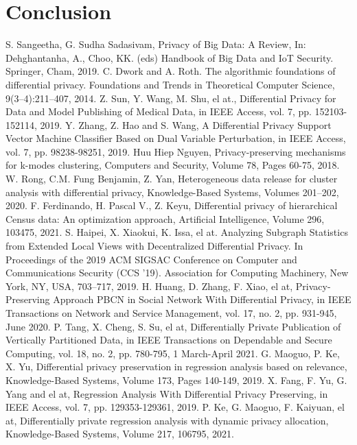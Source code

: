 \documentclass[conference]{IEEEtran}
\begin{document}
\section{Conclusion}


\begin{thebibliography}{00}
 S. Sangeetha, G. Sudha Sadasivam, Privacy of Big Data: A Review, In: Dehghantanha, A., Choo, KK. (eds) Handbook of Big Data and IoT Security. Springer, Cham, 2019.
 C. Dwork and A. Roth. The algorithmic foundations of differential privacy. Foundations and Trends in Theoretical Computer Science, 9(3–4):211–407, 2014.
 Z. Sun, Y. Wang, M. Shu, el at., Differential Privacy for Data and Model Publishing of Medical Data, in IEEE Access, vol. 7, pp. 152103-152114, 2019.
 Y. Zhang, Z. Hao and S. Wang, A Differential Privacy Support Vector Machine Classifier Based on Dual Variable Perturbation, in IEEE Access, vol. 7, pp. 98238-98251, 2019.
 Huu Hiep Nguyen, Privacy-preserving mechanisms for k-modes clustering, Computers and Security, Volume 78, Pages 60-75, 2018.
W. Rong, C.M. Fung Benjamin, Z. Yan, Heterogeneous data release for cluster analysis with differential privacy, Knowledge-Based Systems, Volumes 201–202, 2020.
 F. Ferdinando, H. Pascal V., Z. Keyu, Differential privacy of hierarchical Census data: An optimization approach, Artificial Intelligence, Volume 296, 103475, 2021.
 S. Haipei, X. Xiaokui, K. Issa, el at. Analyzing Subgraph Statistics from Extended Local Views with Decentralized Differential Privacy. In Proceedings of the 2019 ACM SIGSAC Conference on Computer and Communications Security (CCS '19). Association for Computing Machinery, New York, NY, USA, 703–717, 2019.
 H. Huang, D. Zhang, F. Xiao, el at, Privacy-Preserving Approach PBCN in Social Network With Differential Privacy, in IEEE Transactions on Network and Service Management, vol. 17, no. 2, pp. 931-945, June 2020.
 P. Tang, X. Cheng, S. Su, el at, Differentially Private Publication of Vertically Partitioned Data, in IEEE Transactions on Dependable and Secure Computing, vol. 18, no. 2, pp. 780-795, 1 March-April 2021.
 G. Maoguo, P. Ke, X. Yu, Differential privacy preservation in regression analysis based on relevance, Knowledge-Based Systems, Volume 173, Pages 140-149, 2019.
 X. Fang, F. Yu, G. Yang and el at, Regression Analysis With Differential Privacy Preserving, in IEEE Access, vol. 7, pp. 129353-129361, 2019.
 P. Ke, G. Maoguo, F. Kaiyuan, el at, Differentially private regression analysis with dynamic privacy allocation, Knowledge-Based Systems, Volume 217, 106795, 2021.

\end{thebibliography}
\end{document}
